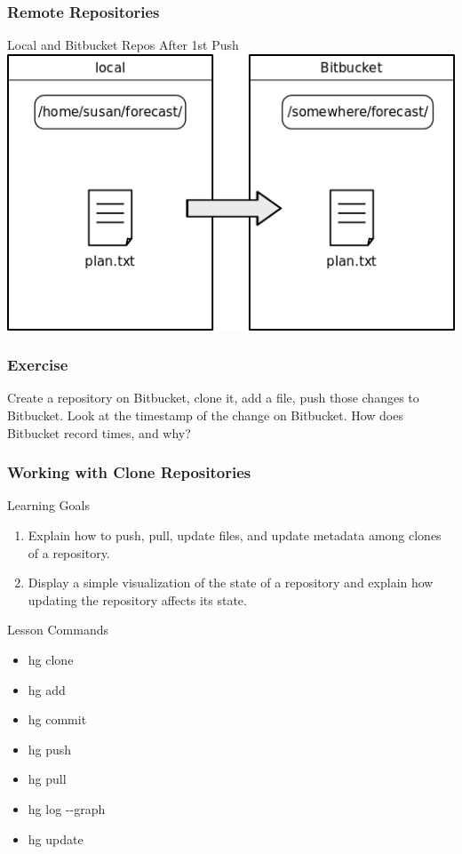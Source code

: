 \documentclass{beamer}
\renewcommand{\dh}{{-}{-}}
\begin{document}
\begin{frame}
  \frametitle{Remote Repositories}
  \begin{block}{Local and Bitbucket Repos After 1st Push}
    \includegraphics[scale=0.55]{fig/bitbucket-repo-after-first-push.png}
  \end{block}
\end{frame}




\begin{frame}
\frametitle{Exercise}
Create a repository on Bitbucket, clone it, add a file, push those changes to Bitbucket.
Look at the timestamp of the change on Bitbucket.
How does Bitbucket record times, and why?
\end{frame}


\begin{frame}[label=clones]
  \frametitle{Working with Clone Repositories}
  \begin{block}{Learning Goals}
    \begin{enumerate}
      \item Explain how to push, pull, update files, and update metadata among clones of a repository.
      \item Display a simple visualization of the state of a repository and explain how updating the repository affects its state.
    \end{enumerate}
  \end{block}
  \begin{block}{Lesson Commands}
    \begin{itemize}
      \item hg clone
      \item hg add
      \item hg commit
      \item hg push
      \item hg pull
      \item hg log \dh graph
      \item hg update
    \end{itemize}
  \end{block}
\end{frame}
\end{document}
